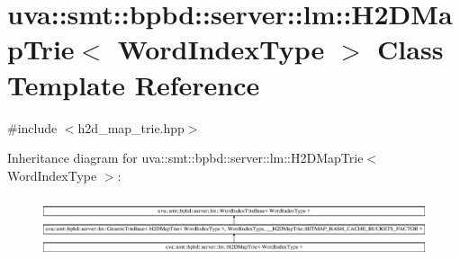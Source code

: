 \hypertarget{classuva_1_1smt_1_1bpbd_1_1server_1_1lm_1_1_h2_d_map_trie}{}\section{uva\+:\+:smt\+:\+:bpbd\+:\+:server\+:\+:lm\+:\+:H2\+D\+Map\+Trie$<$ Word\+Index\+Type $>$ Class Template Reference}
\label{classuva_1_1smt_1_1bpbd_1_1server_1_1lm_1_1_h2_d_map_trie}


{\ttfamily \#include $<$h2d\+\_\+map\+\_\+trie.\+hpp$>$}

Inheritance diagram for uva\+:\+:smt\+:\+:bpbd\+:\+:server\+:\+:lm\+:\+:H2\+D\+Map\+Trie$<$ Word\+Index\+Type $>$\+:\begin{figure}[H]
\begin{center}
\leavevmode
\includegraphics[height=1.812298cm]{classuva_1_1smt_1_1bpbd_1_1server_1_1lm_1_1_h2_d_map_trie}
\end{center}
\end{figure}
